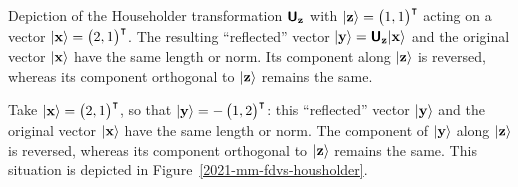 {{\begin{marginfigure}
\begin{center}
{
}
\end{center}
\caption{\label{2021-mm-fdvs-housholder}
Depiction of the Householder transformation $\textsf{\textbf{U}}_{\bf z}$
with
$\vert {\bf z} \rangle =\begin{pmatrix}1,1\end{pmatrix}^\intercal$
acting on a vector $\vert {\bf x} \rangle =\begin{pmatrix}2,1\end{pmatrix}^\intercal$.
The resulting ``reflected'' vector $\vert {\bf y} \rangle = \textsf{\textbf{U}}_{\bf z} \vert {\bf x} \rangle$
and the original vector $\vert {\bf x} \rangle$
have the same length or norm.
Its component along $\vert {\bf z} \rangle$ is reversed, whereas its component orthogonal to
$\vert {\bf z} \rangle$ remains the same.}
\end{marginfigure}
}

Take
 $\vert {\bf x} \rangle =\begin{pmatrix}2,1\end{pmatrix}^\intercal$,
so that
 $\vert {\bf y} \rangle =-\begin{pmatrix}1,2\end{pmatrix}^\intercal$:
this ``reflected'' vector $\vert {\bf y} \rangle$ and the original vector $\vert {\bf x} \rangle$
have the same length or norm.
The component of $\vert {\bf y} \rangle$  along $\vert {\bf z} \rangle$ is reversed, whereas its component orthogonal to
$\vert {\bf z} \rangle$ remains the same.
This situation is depicted in Figure~\ref{2021-mm-fdvs-housholder}.
\eexample
}


